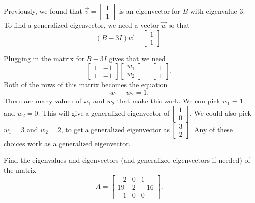 \documentclass{ximera}
\begin{document}
\begin{exampleSol}
    Previously, we found that $\vec{v} = \begin{bmatrix}1 \\ 1 \end{bmatrix}$ is an eigenvector for $B$ with eigenvalue $3$. To find a generalized eigenvector, we need a vector $\vec{w}$ so that
    \[ 
        (B - 3I)\vec{w} = 
        \begin{bmatrix}
            1 \\ 
            1 
        \end{bmatrix}. 
    \] 
    
    Plugging in the matrix for $B - 3I$ gives that we need
    \[ 
        \begin{bmatrix} 
            1 & -1 \\ 
            1 & -1 
        \end{bmatrix} 
        \begin{bmatrix} 
            w_1 \\ 
            w_2 
        \end{bmatrix} 
        = 
        \begin{bmatrix} 
            1 \\ 
            1 
        \end{bmatrix}. 
    \] 
    Both of the rows of this matrix becomes the equation
    \[ 
        w_1 - w_2 = 1. 
    \]
    There are many values of $w_1$ and $w_2$ that make this work. We can pick $w_1 = 1$ and $w_2 = 0$. This will give a generalized eigenvector of $\begin{bmatrix} 1 \\ 0 \end{bmatrix}$. We could also pick $w_1 = 3$ and $w_2 = 2$, to get a generalized eigenvector as $\begin{bmatrix} 3 \\ 2 \end{bmatrix}$. Any of these choices work as a generalized eigenvector.
\end{exampleSol}

\begin{example}
    Find the eigenvalues and eigenvectors (and generalized eigenvectors if needed) of the matrix 
    \[ 
        A = 
        \begin{bmatrix} 
            -2 & 0 & 1 \\ 
            19 & 2 & -16 \\ 
            -1 & 0 & 0 
        \end{bmatrix}. 
    \]
\end{example}
\end{document}
